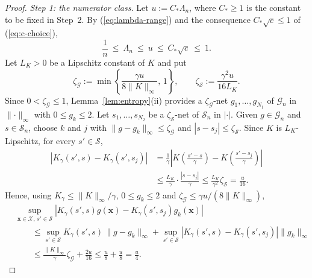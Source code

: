 \documentclass{article} %
\begin{document}
\begin{proof}
\emph{Step 1: the numerator class.}  Let $u:=C_\ast\Lambda_n$, where $C_\ast\ge1$ is the constant to be fixed in Step~2.  By (\ref{eq:lambda-range}) and the consequence $C_\ast\sqrt{c}\le1$ of (\ref{eq:c-choice}),
\begin{equation}
  \frac{1}{n}\ \le\ \Lambda_n\ \le\ u\ \le\ C_\ast\sqrt{c}\ \le\ 1 .
  \label{eq:u-range}
\end{equation}
Let $L_K>0$ be a Lipschitz constant of $K$ and put
\[
  \zeta_{\mathcal{G}}:=\min\left\{\frac{\gamma u}{8\lVert K\rVert_\infty},\,1\right\},
  \qquad
  \zeta_{\mathcal{S}}:=\frac{\gamma^2u}{16L_K} .
\]
Since $0<\zeta_{\mathcal{G}}\le1$, Lemma~\ref{lem:entropy}(ii) provides a $\zeta_{\mathcal{G}}$-net $g_1,\ldots,g_{N_1}$ of $\mathcal{G}_n$ in $\lVert\cdot\rVert_\infty$ with $0\le g_k\le2$.  Let $s_1,\ldots,s_{N_2}$ be a $\zeta_{\mathcal{S}}$-net of $\mathcal{S}_n$ in $|\cdot|$.  Given $g\in\mathcal{G}_n$ and $s\in\mathcal{S}_n$, choose $k$ and $j$ with $\lVert g-g_k\rVert_\infty\le\zeta_{\mathcal{G}}$ and $|s-s_j|\le\zeta_{\mathcal{S}}$.  Since $K$ is $L_K$-Lipschitz, for every $s'\in\mathcal{S}$,
\begin{equation}
\begin{aligned}
  \left|K_{\gamma}(s',s)-K_{\gamma}(s',s_j)\right|
  &=\frac{1}{\gamma}\left|K\!\left(\frac{s'-s}{\gamma}\right)
    -K\!\left(\frac{s'-s_j}{\gamma}\right)\right|
  \\
  &\le\frac{L_K}{\gamma}\cdot\frac{|s-s_j|}{\gamma}
  \le\frac{L_K}{\gamma^2}\zeta_{\mathcal{S}}
  =\frac{u}{16} .
\end{aligned}
  \label{eq:kernel-lipschitz}
\end{equation}
Hence, using $K_{\gamma}\le\lVert K\rVert_\infty/\gamma$, $0\le g_k\le2$ and $\zeta_{\mathcal{G}}\le\gamma u/(8\lVert K\rVert_\infty)$,
\begin{equation}
\begin{aligned}
  &\sup_{\mathbf{x}\in\mathcal{X},\,s'\in\mathcal{S}}
  \left|K_{\gamma}(s',s)g(\mathbf{x})-K_{\gamma}(s',s_j)g_k(\mathbf{x})\right|
  \\
  &\qquad\le\sup_{s'\in\mathcal{S}}K_{\gamma}(s',s)\,\lVert g-g_k\rVert_\infty
   +\sup_{s'\in\mathcal{S}}\left|K_{\gamma}(s',s)-K_{\gamma}(s',s_j)\right|\lVert g_k\rVert_\infty
  \\
  &\qquad\le\frac{\lVert K\rVert_\infty}{\gamma}\zeta_{\mathcal{G}}+\frac{2u}{16}
  \le\frac{u}{8}+\frac{u}{8}
  =\frac{u}{4} .
\end{aligned}
  \label{eq:discretisation}
\end{equation}

\end{proof}
\end{document}
